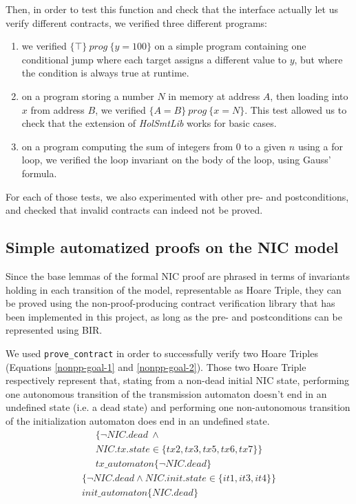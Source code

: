 \documentclass[10pt,a4paper]{article}
\newcommand{\htriple}[3]{\ensuremath{\{#1\}~#2~\{#3\}}}
\begin{document}
\begin{multicols}{2}
Then, in order to test this function and check that the interface actually let us verify different contracts, we verified three different programs:

\begin{enumerate}
  \item we verified \htriple{\top}{prog}{y = 100} on a simple program containing one conditional jump where each target assigns a different value to $y$, but where the condition is always true at runtime.
  \item on a program storing a number $N$ in memory at address $A$, then loading into $x$ from address $B$, we verified \htriple{A=B}{prog}{x=N}. This test allowed us to check that the extension of \textit{HolSmtLib} works for basic cases.
  \item on a program computing the sum of integers from $0$ to a given $n$ using a for loop, we verified the loop invariant on the body of the loop, using Gauss' formula.
\end{enumerate}

For each of those tests, we also experimented with other pre- and postconditions, and checked that invalid contracts can indeed not be proved.

\subsection{Simple automatized proofs on the NIC model} \label{simple-automated-proofs-on-nic}

Since the base lemmas of the formal NIC proof are phrased in terms of invariants holding in each transition of the model, representable as Hoare Triple, they can be proved using the non-proof-producing contract verification library that has been implemented in this project, as long as the pre- and postconditions can be represented using BIR.

We used \texttt{prove\_contract} in order to successfully verify two Hoare Triples (Equations \ref{nonpp-goal-1} and \ref{nonpp-goal-2}). Those two Hoare Triple respectively represent that, stating from a non-dead initial NIC state, performing one autonomous transition of the transmission automaton doesn't end in an undefined state (i.e. a dead state) and performing one non-autonomous transition of the initialization automaton does end in an undefined state.
%
\begin{multline}
  \{\neg NIC.dead~\land\\
  NIC.tx.state \in \{tx2,tx3,tx5,tx6,tx7\}\}\\
	tx\_automaton\{\neg NIC.dead\}
    \label{nonpp-goal-1}
\end{multline}
\begin{multline}
	\{\neg NIC.dead \land NIC.init.state \in \{it1,it3,it4\}\}\\
	init\_automaton\{NIC.dead\}
    \label{nonpp-goal-2}
\end{multline}


\end{multicols}
\end{document}
